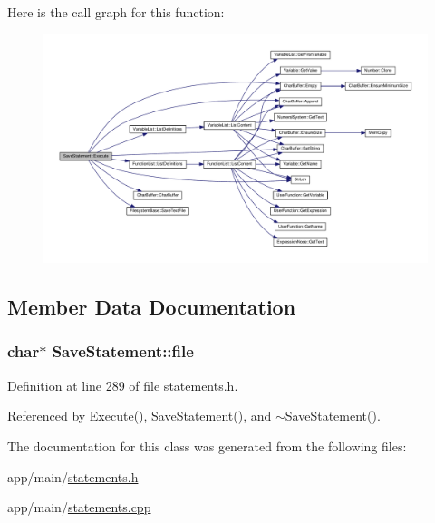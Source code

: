 Here is the call graph for this function\+:\nopagebreak
\begin{figure}[H]
\begin{center}
\leavevmode
\includegraphics[width=350pt]{classSaveStatement_ae94aa8533f620634f97b2835cee1eaa2_cgraph}
\end{center}
\end{figure}




\subsection{Member Data Documentation}
\subsubsection[{\texorpdfstring{file}{file}}]{\setlength{\rightskip}{0pt plus 5cm}char$\ast$ Save\+Statement\+::file\hspace{0.3cm}{\ttfamily [private]}}\hypertarget{classSaveStatement_ad14404fce25b061b62b9b4d9e6e1b830}{}\label{classSaveStatement_ad14404fce25b061b62b9b4d9e6e1b830}


Definition at line 289 of file statements.\+h.



Referenced by Execute(), Save\+Statement(), and $\sim$\+Save\+Statement().



The documentation for this class was generated from the following files\+:\begin{DoxyCompactItemize}
\item 
app/main/\hyperlink{statements_8h}{statements.\+h}\item 
app/main/\hyperlink{statements_8cpp}{statements.\+cpp}\end{DoxyCompactItemize}
